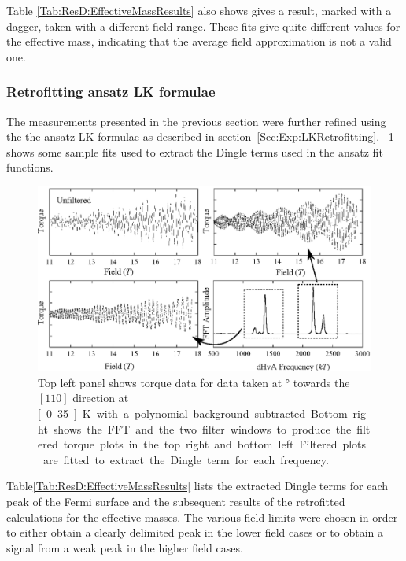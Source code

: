 Table \ref{Tab:ResD:EffectiveMassResults} also shows gives a result, marked with a dagger, taken with a different field range. These fits give quite different values for the effective mass, indicating that the average field approximation is not a valid one.

\subsubsection{Retrofitting ansatz LK formulae}

The measurements presented in the previous section were further refined using the the ansatz LK formulae as described in section~\ref{Sec:Exp:LKRetrofitting}. \Fig~\ref{Fig:ResD:DingleTermExtractionFits} shows some sample fits used to extract the Dingle terms used in the ansatz fit functions.
\begin{figure}[htbp]
    \begin{center}
        \includegraphics[scale=0.9]{Chapter-dHvABaFe2P2/Figures/Mass/FittingDingleTerm/FittingDingleTerm}
        \caption{Top left panel shows torque data for data taken at \unit[12]{\degree} towards the $[110]$ direction at \unit[0.35]{K} with a polynomial background subtracted. Bottom right shows the FFT and the two filter windows to produce the filtered torque plots in the top right and bottom left. Filtered plots are fitted to extract the Dingle term for each frequency.}
        \label{Fig:ResD:DingleTermExtractionFits}
    \end{center}
\end{figure}
Table\ref{Tab:ResD:EffectiveMassResults} lists the extracted Dingle terms for each peak of the Fermi surface and the subsequent results of the retrofitted calculations for the effective masses. The various field limits were chosen in order to either obtain a clearly delimited peak in the lower field cases or to obtain a signal from a weak peak in the higher field cases.


